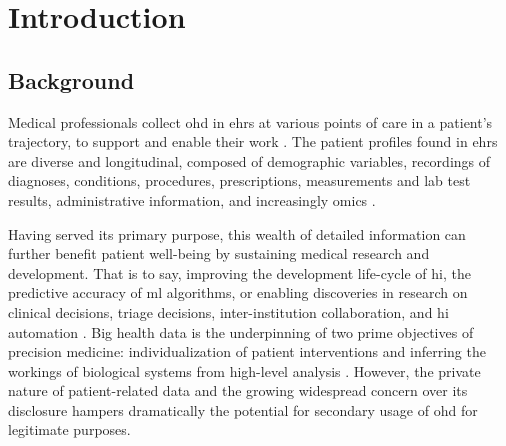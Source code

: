 \glsresetall
\section{Introduction}
    \subsection{Background}
        Medical professionals collect \gls{ohd} in \glspl{ehr} at various points of care in a patient’s trajectory, to support and enable their work \cite{Cowie_2016}. The patient profiles found in \glspl{ehr} are diverse and longitudinal, composed of demographic variables, recordings of diagnoses, conditions, procedures, prescriptions, measurements and lab test results, administrative information, and increasingly omics \cite{Ohdsi2020-vf}.\par
        Having served its primary purpose, this wealth of detailed information can further benefit patient well-being by sustaining medical research and development. That is to say, improving the development life-cycle of \gls{hi}, the predictive accuracy of \gls{ml} algorithms, or enabling discoveries in research on clinical decisions, triage decisions, inter-institution collaboration, and \gls{hi} automation \cite{Rudin_2020, Rankin2020}. Big health data is the underpinning of two prime objectives of precision medicine: individualization of patient interventions and inferring the workings of biological systems from high-level analysis \cite{Capobianco2020}. However, the private nature of patient-related data and the growing widespread concern over its disclosure hampers dramatically the potential for secondary usage of \gls{ohd} for legitimate purposes.\par
        
